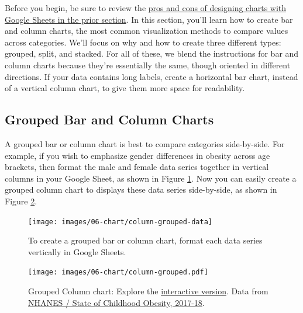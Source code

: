 \documentclass[
  english,
]{book}
\begin{document}
Before you begin, be sure to review the \href{chart-google.html}{pros and cons of designing charts with Google Sheets in the prior section}. In this section, you'll learn how to create bar and column charts, the most common visualization methods to compare values across categories. We'll focus on why and how to create three different types: grouped, split, and stacked. For all of these, we blend the instructions for bar and column charts because they're essentially the same, though oriented in different directions. If your data contains long labels, create a horizontal bar chart, instead of a vertical column chart, to give them more space for readability.

\hypertarget{grouped-bar-and-column-charts}{%
\subsection*{Grouped Bar and Column Charts}\label{grouped-bar-and-column-charts}}

A grouped bar or column chart is best to compare categories side-by-side. For example, if you wish to emphasize gender differences in obesity across age brackets, then format the male and female data series together in vertical columns in your Google Sheet, as shown in Figure \ref{fig:column-grouped-data}. Now you can easily create a grouped column chart to displays these data series side-by-side, as shown in Figure \ref{fig:column-grouped}.



\begin{figure}
\texttt{[image: images/06-chart/column-grouped-data]} \caption{To create a grouped bar or column chart, format each data series vertically in Google Sheets.}\label{fig:column-grouped-data}
\end{figure}



\begin{figure}
\centering
\texttt{[image: images/06-chart/column-grouped.pdf]}
\caption{\label{fig:column-grouped}Grouped Column chart: Explore the \href{https://docs.google.com/spreadsheets/d/e/2PACX-1vSkvNNrgYCpNtsaCRxn7g5o4UR8OJXSxBWvUK531t5vYubt39gecV9yLIfic89DCeJnGNvpRttFfKzn/pubchart?oid=787918829\&format=interactive}{interactive version}. Data from \href{https://stateofchildhoodobesity.org/monitor/}{NHANES / State of Childhood Obesity, 2017-18}.}
\end{figure}
\end{document}
